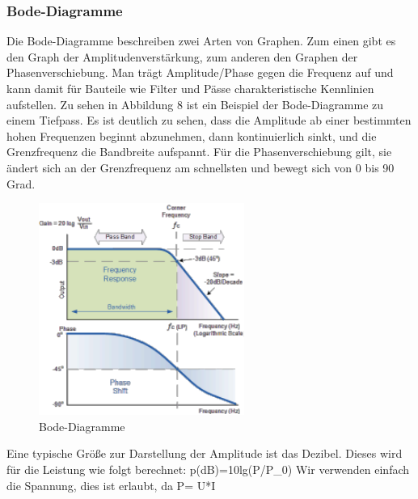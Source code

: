 \subsubsection{Bode-Diagramme}
Die Bode-Diagramme beschreiben zwei Arten von Graphen. Zum einen gibt es den Graph der Amplitudenverstärkung, zum anderen den Graphen der Phasenverschiebung. Man trägt Amplitude/Phase gegen die Frequenz auf und kann damit für Bauteile wie Filter und Pässe charakteristische Kennlinien aufstellen. Zu sehen in Abbildung 8 ist ein Beispiel der Bode-Diagramme zu einem Tiefpass. Es ist deutlich zu sehen, dass die Amplitude ab einer bestimmten hohen Frequenzen beginnt abzunehmen, dann kontinuierlich sinkt, und die Grenzfrequenz die Bandbreite aufspannt. Für die Phasenverschiebung gilt, sie ändert sich an der Grenzfrequenz am schnellsten und bewegt sich von 0 bis 90 Grad.
\begin{figure}[H]
    \centering
    \includegraphics[width=0.6\textwidth]{Abb/bode.pdf}
    \caption{Bode-Diagramme} 
\end{figure}

Eine typische Größe zur Darstellung der Amplitude ist das Dezibel. Dieses wird für die Leistung wie folgt berechnet:
p(dB)=10lg(P/P_0)
Wir verwenden einfach die Spannung, dies ist erlaubt, da P= U*I

